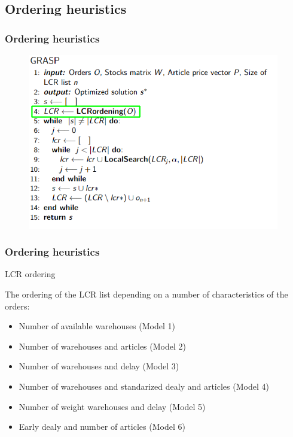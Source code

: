 \documentclass[t,compress,11pt,xcolor=dvipsnames,pdf,english]{beamer}
\begin{document}
    
\subsection{Ordering heuristics}

\begin{frame}[c]{ }
    \frametitle{Ordering heuristics}
    \begin{figure}
        \includegraphics[width=11cm]{img/GRASPALGO_ordening.png}
        \centering
    \end{figure}        
\end{frame}

\begin{frame}[c]{ }
    \frametitle{Ordering heuristics}
    \begin{block}{LCR ordering}
        {
            The ordering of the LCR list depending on a number of characteristics of the orders:
            \begin{itemize}
                \item Number of available warehouses (Model 1)
                \item Number of warehouses and articles (Model 2)
                \item Number of warehouses and delay (Model 3)
                \item Number of warehouses and standarized dealy and articles (Model 4)
                \item Number of weight warehouses and delay (Model 5)
                \item Early dealy and number of articles (Model 6)
            \end{itemize}
        }
    \end{block}
\end{frame}
\end{document}
